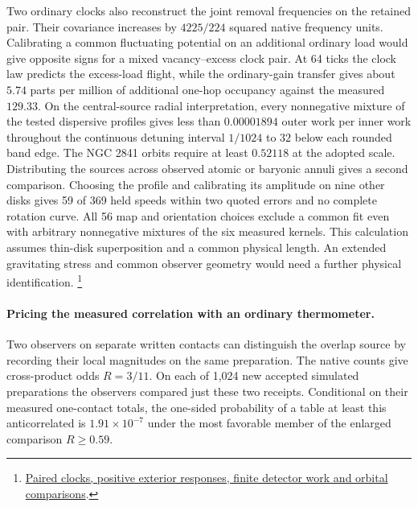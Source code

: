 \documentclass[11pt]{article}
\begin{document}
Two ordinary clocks also reconstruct the joint removal frequencies on
the retained pair. Their covariance increases by \(4225/224\) squared
native frequency units. Calibrating a common fluctuating potential on
an additional ordinary load would give opposite signs for a mixed
vacancy--excess clock pair. At 64 ticks the clock law predicts the
excess-load flight, while the ordinary-gain transfer gives about
\(5.74\) parts per million of additional one-hop occupancy against the
measured \(129.33\). On the central-source radial interpretation, every
nonnegative mixture of the tested dispersive profiles gives less than
\(0.00001894\) outer work per inner work throughout the continuous
detuning interval \(1/1024\) to \(32\) below each rounded band edge.
The NGC 2841 orbits require at least \(0.52118\) at the adopted scale.
Distributing the sources across observed atomic or baryonic annuli gives
a second comparison. Choosing the profile and calibrating its amplitude
on nine other disks gives 59 of 369 held speeds within two quoted errors
and no complete rotation curve. All 56 map and orientation choices
exclude a common fit even with arbitrary nonnegative mixtures of the
six measured kernels. This calculation assumes thin-disk superposition
and a common physical length. An extended gravitating stress and common
observer geometry would need a further physical identification.%
\footnote{\href{https://github.com/FloatingPragma/observer-patch-holography/blob/main/model/experiments/interval_echo_shell_flux/product_address/green_response/material_recoil/overlap_source/native_boundary/stock/aperture/CLOCK_SOURCE_RESULTS.md}{Paired clocks, positive exterior responses, finite detector work and orbital comparisons}.}

\paragraph{Pricing the measured correlation with an ordinary thermometer.}
Two observers on separate written contacts can distinguish the overlap
source by recording their local magnitudes on the same preparation.
The native counts give cross-product odds \(R=3/11\). On each of 1,024
new accepted simulated preparations the observers compared just these
two receipts. Conditional on their measured one-contact totals, the
one-sided probability of a table at least this anticorrelated is
\(1.91\times10^{-7}\) under the most favorable member of the enlarged
comparison \(R\geq 0.59\).
\end{document}

